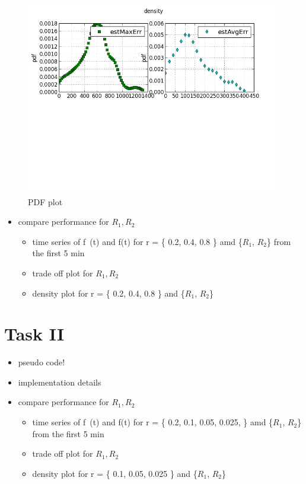 \documentclass[a4paper, smallheadings,english]{scrartcl}
\begin{document}
\begin{figure}[h!]
    \begin{center}
        \includegraphics[scale=0.7]{plots/pdf_of_error}
    \end{center}
    \caption{PDF plot}
    \label{fig:pdf}
\end{figure}



\begin{itemize}
    \item compare performance for $R_1, R_2$
    \begin{itemize}
        \item time series of f~(t) and f(t) for r = \{ 0.2, 0.4, 0.8 \} amd \{$R_1$, $R_2$\} from the first 5 min
        \item trade off plot for $R_1, R_2$
        \item density plot for r = \{ 0.2, 0.4, 0.8 \} and \{$R_1$, $R_2$\}
    \end{itemize}
\end{itemize}

\section{Task II}
\begin{itemize}
    \item pseudo code!
    \item implementation details
    \item compare performance for $R_1, R_2$
    \begin{itemize}
        \item time series of f~(t) and f(t) for r = \{ 0.2, 0.1, 0.05, 0.025, \} amd \{$R_1$, $R_2$\} from the first 5 min
        \item trade off plot for $R_1, R_2$
        \item density plot for r = \{ 0.1, 0.05, 0.025 \} and \{$R_1$, $R_2$\}
    \end{itemize}
\end{itemize}
\end{document}
